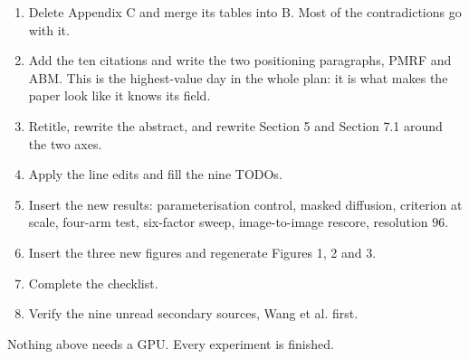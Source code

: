 \documentclass[11pt]{article}
\begin{document}
\begin{enumerate}
\item Delete Appendix C and merge its tables into B. Most of the contradictions go with it.
\item Add the ten citations and write the two positioning paragraphs, PMRF and ABM. This is the
highest-value day in the whole plan: it is what makes the paper look like it knows its field.
\item Retitle, rewrite the abstract, and rewrite Section 5 and Section 7.1 around the two axes.
\item Apply the line edits and fill the nine TODOs.
\item Insert the new results: parameterisation control, masked diffusion, criterion at scale,
four-arm test, six-factor sweep, image-to-image rescore, resolution $96$.
\item Insert the three new figures and regenerate Figures 1, 2 and 3.
\item Complete the checklist.
\item Verify the nine unread secondary sources, Wang et al. first.
\end{enumerate}

Nothing above needs a GPU. Every experiment is finished.
\end{document}
